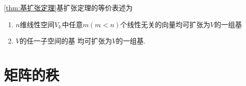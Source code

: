 \begin{formal}
\begin{theorem}[基扩张定理]\label{thm:基扩张定理2}\cref{thm:基扩张定理}基扩张定理的等价表述为
    \begin{enumerate}[label=\textup{(\arabic*)}]
        \item $n$维线性空间$V_{\mathbb{K}}$中任意$m\left(m < n\right)$个线性无关的向量均可扩张为$V$的一组基
        \item $V$的任一子空间的基
    均可扩张为$V$的一组基.
    \end{enumerate}
\end{theorem}
\end{formal}
\newpage
\section{矩阵的秩}
